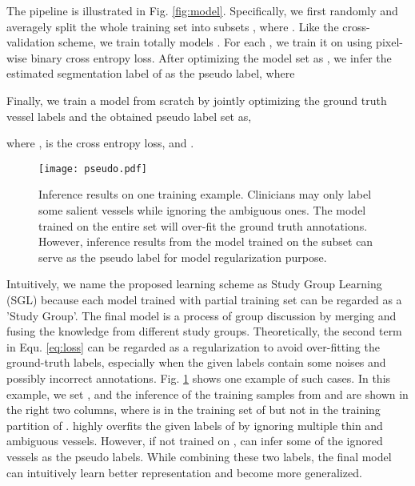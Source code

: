 \documentclass[runningheads]{llncs}
\begin{document}
The pipeline is illustrated in Fig. \ref{fig:model}. Specifically, we first randomly and averagely split the whole training set  into  subsets , where . Like the cross-validation scheme, we train totally  models . For each , we train it on  using pixel-wise binary cross entropy loss. After optimizing the model set  as , we infer the estimated segmentation label  of  as the pseudo label, where
 
Finally, we train a model  from scratch by jointly optimizing the ground truth vessel labels  and the obtained pseudo label set  as,
 
where ,  is the cross entropy loss, and .
\begin{figure}[t]\centering
\texttt{[image: pseudo.pdf]}
\caption{Inference results on one training example. Clinicians may only label some salient vessels while ignoring the ambiguous ones. The model trained on the entire set will over-fit the ground truth annotations. However, inference results from the model trained on the subset can serve as the pseudo label for model regularization purpose. }
  \label{fig:inf}
\end{figure}

Intuitively, we name the proposed learning scheme as Study Group Learning (SGL) because each model  trained with partial training set can be regarded as a 'Study Group'. The final model  is a process of group discussion by merging and fusing the knowledge from different study groups. Theoretically, the second term in Equ. \ref{eq:loss} can be regarded as a regularization to avoid over-fitting the ground-truth labels, especially when the given labels contain some noises and possibly incorrect annotations. Fig. \ref{fig:inf} shows one example of such cases. In this example, we set , and the inference of the training samples  from  and  are shown in the right two columns, where  is in the training set of  but not in the training partition of .  highly overfits the given labels of  by ignoring multiple thin and ambiguous vessels. However, if not trained on ,  can infer some of the ignored vessels as the pseudo labels. While combining these two labels, the final model  can intuitively learn better representation and become more generalized. 
\end{document}
